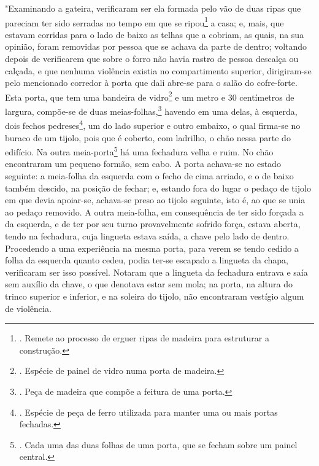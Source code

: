 "Examinando a gateira, verificaram ser ela formada pelo vão de duas
ripas que pareciam ter sido serradas no tempo em que se ripou\footnote{.
  Remete ao processo de erguer ripas de madeira para estruturar a
  construção.} a casa; e, mais, que estavam corridas para o lado de
baixo as telhas que a cobriam, as quais, na sua opinião, foram removidas
por pessoa que se achava da parte de dentro; voltando depois de
verificarem que sobre o forro não havia rastro de pessoa descalça ou
calçada, e que nenhuma violência existia no compartimento superior,
dirigiram-se pelo mencionado corredor à porta que dali abre-se para o
salão do cofre-forte. Esta porta, que tem uma bandeira de
vidro\footnote{. Espécie de painel de vidro numa porta de madeira.} e um
metro e 30 centímetros de largura, compõe-se de duas
meias-folhas,\footnote{. Peça de madeira que compõe a feitura de uma
  porta.} havendo em uma delas, à esquerda, dois fechos
pedreses\footnote{. Espécie de peça de ferro utilizada para manter uma
  ou mais portas fechadas.}, um do lado superior e outro embaixo, o qual
firma-se no buraco de um tijolo, pois que é coberto, com ladrilho, o
chão nessa parte do edifício. Na outra meia-porta\footnote{. Cada uma
  das duas folhas de uma porta, que se fecham sobre um painel central.}
há uma fechadura velha e ruim. No chão encontraram um pequeno formão,
sem cabo. A porta achava-se no estado seguinte: a meia-folha da esquerda
com o fecho de cima arriado, e o de baixo também descido, na posição de
fechar; e, estando fora do lugar o pedaço de tijolo em que devia
apoiar-se, achava-se preso ao tijolo seguinte, isto é, ao que se unia ao
pedaço removido. A outra meia-folha, em consequência de ter sido forçada
a da esquerda, e de ter por seu turno provavelmente sofrido força,
estava aberta, tendo na fechadura, cuja lingueta estava saída, a chave
pelo lado de dentro. Procedendo a uma experiência na mesma porta, para
verem se tendo cedido a folha da esquerda quanto cedeu, podia ter-se
escapado a lingueta da chapa, verificaram ser isso possível. Notaram que
a lingueta da fechadura entrava e saía sem auxílio da chave, o que
denotava estar sem mola; na porta, na altura do trinco superior e
inferior, e na soleira do tijolo, não encontraram vestígio algum de
violência.

